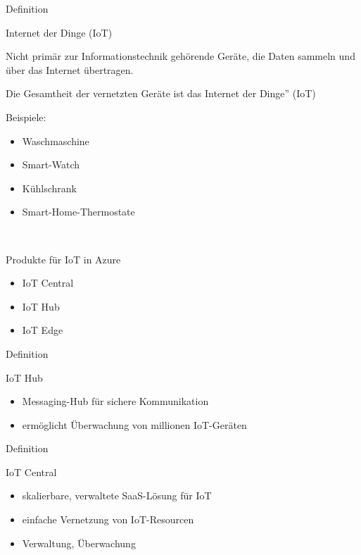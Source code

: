 \documentclass{scrartcl}
\newenvironment{flashcard}[2][]{%
    #1
    \vfill
    \centerline{\Large{#2}}
    \vfill
\newpage
}
{\newpage}
\begin{document}
    \begin{flashcard}[Definition]{Internet der Dinge (IoT)}
        Nicht primär zur Informationstechnik gehörende Geräte, die Daten sammeln und über das Internet übertragen.

        \vspace{5mm}
        Die Gesamtheit der vernetzten Geräte ist das Internet der Dinge'' (IoT)

        \vspace{5mm}
        Beispiele:
        \begin{itemize}
            \item Waschmaschine
            \item Smart-Watch
            \item Kühlschrank
            \item Smart-Home-Thermostate
        \end{itemize}

    \end{flashcard}

    \begin{flashcard}[\ ]{Produkte für IoT in Azure}
        \begin{itemize}
            \item IoT Central
            \item IoT Hub
            \item IoT Edge
        \end{itemize}

    \end{flashcard}

    \begin{flashcard}[Definition]{IoT Hub}
        \begin{itemize}
            \item Messaging-Hub für sichere Kommunikation
            \item ermöglicht Überwachung von millionen IoT-Geräten
        \end{itemize}
    \end{flashcard}

    \begin{flashcard}[Definition]{IoT Central}
        \begin{itemize}
            \item skalierbare, verwaltete SaaS-Lösung für IoT
            \item einfache Vernetzung von IoT-Resourcen
            \item Verwaltung, Überwachung
        \end{itemize}
    \end{flashcard}
\end{document}
